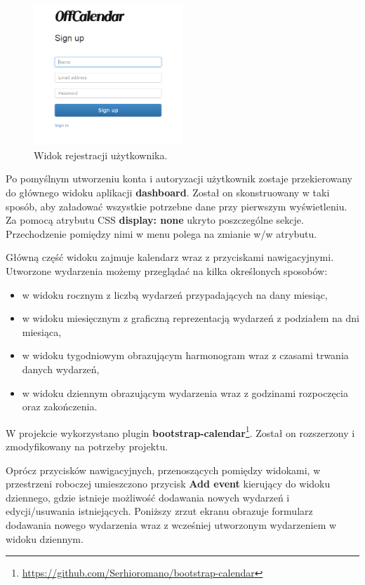 \begin{figure}[H]
\centering
\includegraphics[width=0.5\textwidth]{register.png}
\caption{Widok rejestracji użytkownika.}
\end{figure}

Po pomyślnym utworzeniu konta i autoryzacji użytkownik zostaje przekierowany do głównego widoku aplikacji \textbf{dashboard}. Został on skonstruowany w taki sposób, aby załadować wszystkie potrzebne dane przy pierwszym wyświetleniu. Za pomocą atrybutu CSS \textbf{display: none} ukryto poszczególne sekcje. Przechodzenie pomiędzy nimi w menu polega na zmianie w/w atrybutu.

Główną część widoku zajmuje kalendarz wraz z przyciskami nawigacyjnymi. Utworzone wydarzenia możemy przeglądać na kilka określonych sposobów:

\begin{itemize}
\item w widoku rocznym z liczbą wydarzeń przypadających na dany miesiąc,
\item w widoku miesięcznym z graficzną reprezentacją wydarzeń z podziałem na dni miesiąca,
\item w widoku tygodniowym obrazującym harmonogram wraz z czasami trwania danych wydarzeń,
\item w widoku dziennym obrazującym wydarzenia wraz z godzinami rozpoczęcia oraz zakończenia.
\end{itemize}

W projekcie wykorzystano plugin \textbf{bootstrap-calendar}\footnote{\url{https://github.com/Serhioromano/bootstrap-calendar}}. Został on rozszerzony i zmodyfikowany na potrzeby projektu.

Oprócz przycisków nawigacyjnych, przenoszących pomiędzy widokami, w przestrzeni roboczej umieszczono przycisk \textbf{Add event} kierujący do widoku dziennego, gdzie istnieje możliwość dodawania nowych wydarzeń i edycji/usuwania istniejących. Poniższy zrzut ekranu obrazuje formularz dodawania nowego wydarzenia wraz z wcześniej utworzonym wydarzeniem w widoku dziennym.

